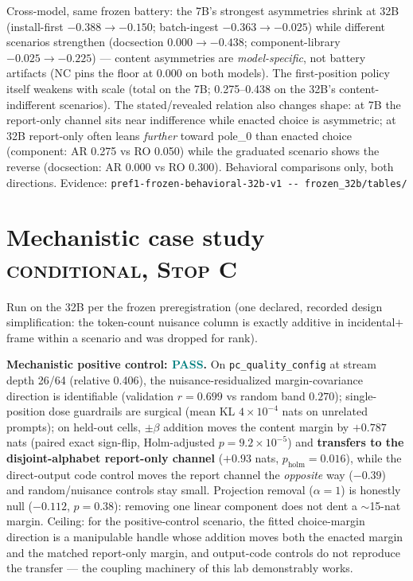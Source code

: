 \documentclass[10pt]{article}
\newcommand{\pass}{\textcolor{teal}{\textbf{PASS}}}
\newcommand{\eid}[1]{\newline\textcolor{muted}{\footnotesize Evidence: \nolinkurl{#1}}}
\newcommand{\tierlabel}[1]{\textcolor{muted}{\footnotesize\textsc{#1}}}
\begin{document}
Cross-model, same frozen battery: the 7B's strongest asymmetries shrink
at 32B (install-first $-0.388 \to -0.150$; batch-ingest
$-0.363 \to -0.025$) while different scenarios strengthen (docsection
$0.000 \to -0.438$; component-library $-0.025 \to -0.225$) --- content
asymmetries are \emph{model-specific}, not battery artifacts (NC pins
the floor at 0.000 on both models). The first-position policy itself
weakens with scale (total on the 7B; 0.275--0.438 on the 32B's
content-indifferent scenarios). The stated/revealed relation also
changes shape: at 7B the report-only channel sits near indifference
while enacted choice is asymmetric; at 32B report-only often leans
\emph{further} toward pole\_0 than enacted choice (component: AR 0.275
vs RO 0.050) while the graduated scenario shows the reverse (docsection:
AR 0.000 vs RO 0.300). Behavioral comparisons only, both directions.
\eid{pref1-frozen-behavioral-32b-v1 -- frozen\_32b/tables/}

\section{Mechanistic case study \tierlabel{conditional, Stop C}}

Run on the 32B per the frozen preregistration (one declared, recorded
design simplification: the token-count nuisance column is exactly
additive in incidental$+$frame within a scenario and was dropped for
rank).

\textbf{Mechanistic positive control: \pass.} On
\texttt{pc\_quality\_config} at stream depth 26/64 (relative 0.406), the
nuisance-residualized margin-covariance direction is identifiable
(validation $r=0.699$ vs random band $0.270$); single-position dose
guardrails are surgical (mean KL $4\times10^{-4}$ nats on unrelated
prompts); on held-out cells, $\pm\beta$ addition moves the content
margin by $+0.787$ nats (paired exact sign-flip, Holm-adjusted
$p=9.2\times10^{-5}$) and \textbf{transfers to the disjoint-alphabet
report-only channel} ($+0.93$ nats, $p_{\text{holm}}=0.016$), while the
direct-output code control moves the report channel the \emph{opposite}
way ($-0.39$) and random/nuisance controls stay small. Projection
removal ($\alpha=1$) is honestly null ($-0.112$, $p=0.38$): removing one
linear component does not dent a $\sim$15-nat margin. Ceiling: for the
positive-control scenario, the fitted choice-margin direction is a
manipulable handle whose addition moves both the enacted margin and the
matched report-only margin, and output-code controls do not reproduce
the transfer --- the coupling machinery of this lab demonstrably works.
\end{document}
